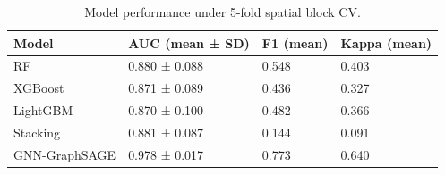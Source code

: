 \begin{table}
\caption{Model performance under 5-fold spatial block CV.}
\label{tab:model_comparison_auto}
\begin{tabular}{llll}
\toprule
Model & AUC (mean ± SD) & F1 (mean) & Kappa (mean) \\
\midrule
RF & 0.880 ± 0.088 & 0.548 & 0.403 \\
XGBoost & 0.871 ± 0.089 & 0.436 & 0.327 \\
LightGBM & 0.870 ± 0.100 & 0.482 & 0.366 \\
Stacking & 0.881 ± 0.087 & 0.144 & 0.091 \\
GNN-GraphSAGE & 0.978 ± 0.017 & 0.773 & 0.640 \\
\bottomrule
\end{tabular}
\end{table}
